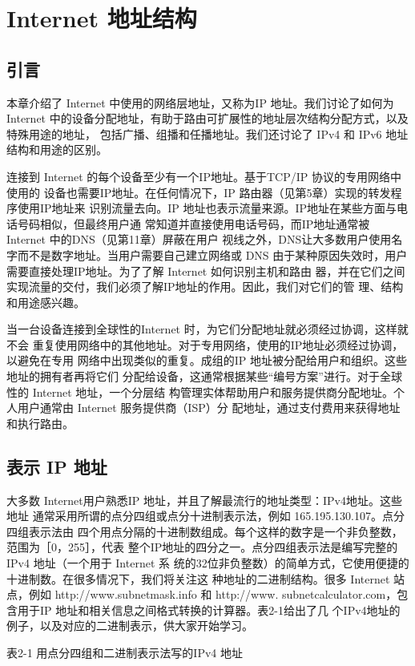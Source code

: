 \chapter{Internet 地址结构}
\section{引言}
本章介绍了 Internet 中使用的网络层地址，又称为IP 地址。我们讨论了如何为 Internet
中的设备分配地址，有助于路由可扩展性的地址层次结构分配方式，以及特殊用途的地址，
包括广播、组播和任播地址。我们还讨论了 IPv4 和 IPv6 地址结构和用途的区别。

连接到 Internet 的每个设备至少有一个IP地址。基于TCP/IP 协议的专用网络中使用的
设备也需要IP地址。在任何情况下，IP 路由器（见第5章）实现的转发程序使用IP地址来
识别流量去向。IP 地址也表示流量来源。IP地址在某些方面与电话号码相似，但最终用户通
常知道并直接使用电话号码，而IP地址通常被 Internet 中的DNS（见第11章）屏蔽在用户
视线之外，DNS让大多数用户使用名字而不是数字地址。当用户需要自己建立网络或 DNS
由于某种原因失效时，用户需要直接处理IP地址。为了了解 Internet 如何识别主机和路由
器，并在它们之间实现流量的交付，我们必须了解IP地址的作用。因此，我们对它们的管
理、结构和用途感兴趣。

当一台设备连接到全球性的Internet 时，为它们分配地址就必须经过协调，这样就不会
重复使用网络中的其他地址。对于专用网络，使用的IP地址必须经过协调，以避免在专用
网络中出现类似的重复。成组的IP 地址被分配给用户和组织。这些地址的拥有者再将它们
分配给设备，这通常根据某些“编号方案”进行。对于全球性的 Internet 地址，一个分层结
构管理实体帮助用户和服务提供商分配地址。个人用户通常由 Internet 服务提供商（ISP）分
配地址，通过支付费用来获得地址和执行路由。

\section{表示 IP 地址}
大多数 Internet用户熟悉IP 地址，并且了解最流行的地址类型：IPv4地址。这些地址
通常采用所谓的点分四组或点分十进制表示法，例如 165.195.130.107。点分四组表示法由
四个用点分隔的十进制数组成。每个这样的数字是一个非负整数，范围为［0，255］，代表
整个IP地址的四分之一。点分四组表示法是编写完整的IPv4 地址（一个用于 Internet 系
统的32位非负整数）的简单方式，它使用便捷的十进制数。在很多情况下，我们将关注这
种地址的二进制结构。很多 Internet 站点，例如 http://www.subnetmask.info 和 http://www.
subnetcalculator.com，包含用于IP 地址和相关信息之间格式转换的计算器。表2-1给出了几
个IPv4地址的例子，以及对应的二进制表示，供大家开始学习。

表2-1 用点分四组和二进制表示法写的IPv4 地址


